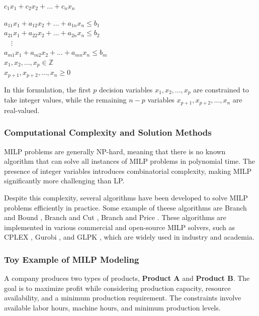 \documentclass [version=final]{iacrcc}
\begin{document}
\begin{center}
    $c_1x_1 + c_2x_2 + \dots + c_nx_n $
\end{center}
\begin{center}
    $  a_{11}x_1 + a_{12}x_2 + \dots + a_{1n}x_n \leq b_1 $ \\
    $ a_{21}x_1 + a_{22}x_2 + \dots + a_{2n}x_n \leq b_2 $ \\
    $ \quad \vdots $ \\
    $ a_{m1}x_1 + a_{m2}x_2 + \dots + a_{mn}x_n \leq b_m $ \\
    $ x_1, x_2, \dots, x_p \in \mathbb{Z} $ \\
    $ x_{p+1}, x_{p+2}, \dots, x_n \geq 0 $
\end{center}



In this formulation, the first $ p $ decision variables $ x_1, x_2, \dots, x_p $ are constrained to take integer values, while the remaining $ n-p $ variables $ x_{p+1}, x_{p+2}, \dots, x_n $ are real-valued. 

\subsubsection{Computational Complexity and Solution Methods}
MILP problems are generally NP-hard, meaning that there is no known algorithm that can solve all instances of MILP problems in polynomial time. The presence of integer variables introduces combinatorial complexity, making MILP significantly more challenging than LP.

Despite this complexity, several algorithms have been developed to solve MILP problems efficiently in practice. Some example of theese algorithms are
Branch and Bound \cite{land1960branch}, Branch and Cut \cite{padberg1991branch}, Branch and Price \cite{barnhart1998branch}.
These algorithms are implemented in various commercial and open-source MILP solvers, such as CPLEX \cite{studio2016ibm}, Gurobi \cite{gurobi2021gurobi}, and GLPK \cite{makhorin2008glpk}, which are widely used in industry and academia.

\subsubsection{Toy Example of MILP Modeling}

A company produces two types of products, \textbf{Product A} and \textbf{Product B}. The goal is to maximize profit while considering production capacity, resource availability, and a minimum production requirement. The constraints involve available labor hours, machine hours, and minimum production levels.
\end{document}
